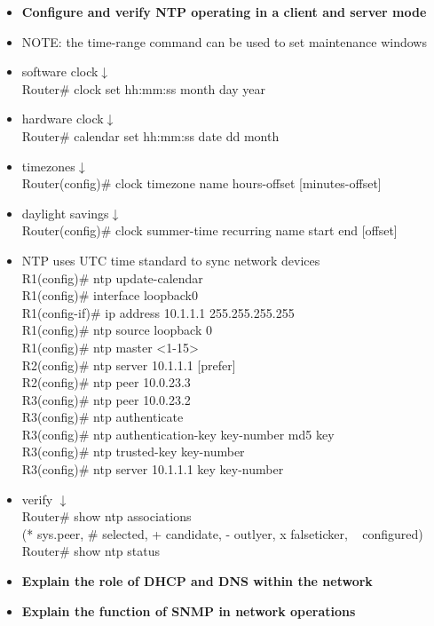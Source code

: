 \documentclass{article}
\begin{document}
\begin{itemize}
  \item \textbf{Configure and verify NTP operating in a client and server mode}
  	\item[] NOTE: the time-range command can be used to set maintenance windows\\
  	\item[] software clock$\downarrow$\\
		Router\# clock set hh:mm:ss month day year
	\item[] hardware clock$\downarrow$\\
		Router\# calendar set hh:mm:ss date dd month
	\item[] timezones$\downarrow$\\
		Router(config)\# clock timezone name hours-offset [minutes-offset]
	\item[] daylight savings$\downarrow$\\
		Router(config)\# clock summer-time recurring name start end [offset]
	\item[] NTP uses UTC time standard to sync network devices\\
		R1(config)\# ntp update-calendar\\
		R1(config)\# interface loopback0\\
		R1(config-if)\# ip address 10.1.1.1 255.255.255.255\\
		R1(config)\# ntp source loopback 0\\
		R1(config)\# ntp master \textless 1-15\textgreater\\
		R2(config)\# ntp server 10.1.1.1 [prefer]\\
		R2(config)\# ntp peer 10.0.23.3\\
		R3(config)\# ntp peer 10.0.23.2\\
		R3(config)\# ntp authenticate\\
		R3(config)\# ntp authentication-key key-number md5 key\\
		R3(config)\# ntp trusted-key key-number\\
		R3(config)\# ntp server 10.1.1.1 key key-number
	\item[] verify $\downarrow$\\
		Router\# show ntp associations\\
		(* sys.peer, \# selected, + candidate, - outlyer, x falseticker, ~ configured)\\
		Router\# show ntp status
  \item \textbf{Explain the role of DHCP and DNS within the network}
  \item \textbf{Explain the function of SNMP in network operations}

\end{itemize}
\end{document}
